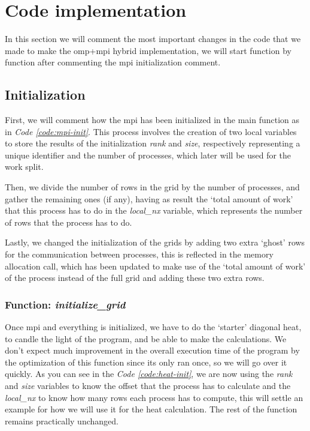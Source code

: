 \documentclass[../main.tex]{subfiles}
\begin{document}
\section{Code implementation}

In this section we will comment the most important changes in the code that we made to make the \acrshort{omp}+\acrshort{mpi} hybrid implementation, we will start function by function after commenting the \acrshort{mpi} initialization comment.

\subsection{Initialization}

First, we will comment how the \acrshort{mpi} has been initialized in the main function as in \textit{Code \ref{code:mpi-init}}.
This process involves the creation of two local variables to store the results of the initialization \textit{rank} and \textit{size}, respectively representing a unique identifier and the number of processes, which later will be used for the work split.

Then, we divide the number of rows in the grid by the number of processes, and gather the remaining ones (if any), having as result the `total amount of work' that this process has to do in the \textit{local\_nx} variable, which represents the number of rows that the process has to do.

Lastly, we changed the initialization of the grids by adding two extra `ghost' rows for the communication between processes, this is reflected in the memory allocation call, which has been updated to make use of the `total amount of work' of the process instead of the full grid and adding these two extra rows.

\subsubsection{Function: \textit{initialize\_grid}}

Once \acrshort{mpi} and everything is initialized, we have to do the `starter' diagonal heat, to candle the light of the program, and be able to make the calculations. We don't expect much improvement in the overall execution time of the program by the optimization of this function since its only ran once, so we will go over it quickly.
As you can see in the \textit{Code \ref{code:heat-init}}, we are now using the \textit{rank} and \textit{size} variables to know the offset that the process has to calculate and the \textit{local\_nx} to know how many rows each process has to compute, this will settle an example for how we will use it for the heat calculation. The rest of the function remains practically unchanged.
\end{document}
